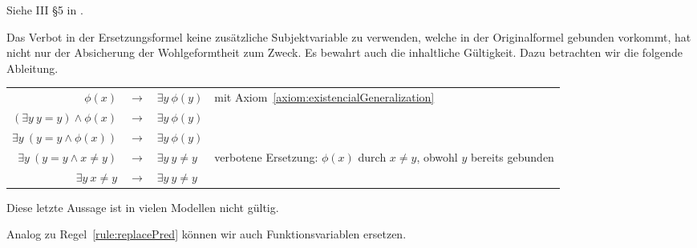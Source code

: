 \documentclass[a4paper,german,10pt,twoside]{book}
\theoremstyle{definition}
\theoremstyle{remark}
\begin{document}
Siehe III \S 5 in \cite{hilback}.

\par
Das Verbot in der Ersetzungsformel keine zus{\"a}tzliche Subjektvariable zu verwenden, welche in der Originalformel gebunden vorkommt, hat nicht nur der Absicherung der Wohlgeformtheit zum Zweck. Es bewahrt auch die inhaltliche G{\"u}ltigkeit. Dazu betrachten wir die folgende Ableitung.

\par
\begin{tabularx}{\linewidth}{rclX}
  $ \phi(x)$                             & $\rightarrow$ & $\exists y \ \phi(y)$  
    & mit Axiom~\ref{axiom:existencialGeneralization} \\
  $ (\exists y \ y = y) \land \phi(x)$   & $\rightarrow$ & $\exists y \ \phi(y)$  
    &  \\
  $ \exists y \ (y = y \land \phi(x))$   & $\rightarrow$ & $\exists y \ \phi(y)$  
    &  \\
  $ \exists y \ (y = y \land x \neq y)$  & $\rightarrow$ & $\exists y \ y \neq y$  
    & verbotene Ersetzung: $\phi(x)$ durch $x \neq y$, obwohl $y$ bereits gebunden \\
  $ \exists y \  x \neq y$  & $\rightarrow$ & $\exists y \ y \neq y$  
    &
\end{tabularx}

\par
Diese letzte Aussage ist in vielen Modellen nicht g{\"u}ltig.


\par
Analog zu Regel~\ref{rule:replacePred} k{\"o}nnen wir auch Funktionsvariablen ersetzen.
\end{document}
